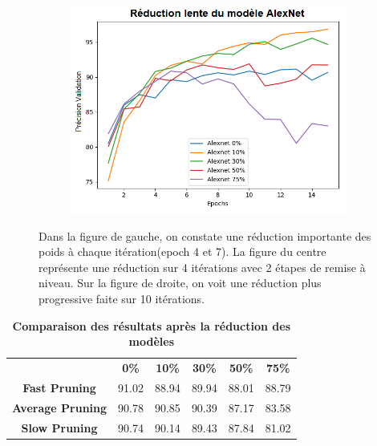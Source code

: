 \documentclass[12pt]{article}
\begin{document}
\begin{figure}[H]
\begin{subfigure}[b]{0.33\textwidth}
		\label{fig:pruneratioslow}
	\end{subfigure}
	\begin{subfigure}[b]{0.33\textwidth}
		\centering
		\includegraphics[width=\textwidth]{fig/prune_ratio_slow_fr}
		\label{fig:pruneratioslow}
	\end{subfigure}
	\caption{Dans la figure de gauche, on constate une réduction importante des poids à chaque itération(epoch 4 et 7). La figure du centre représente une réduction sur 4 itérations avec 2 étapes de remise à niveau. Sur la figure de droite, on voit une réduction plus progressive faite sur 10 itérations.}
\end{figure}

\begin{table}[H]
	\centering
	\caption {\textbf{Comparaison des résultats après la réduction des modèles}}
	\begin{tabular}{clllll}
		\textbf{}                & \multicolumn{1}{c}{\textbf{0\%}} & \multicolumn{1}{c}{\textbf{10\%}} & \multicolumn{1}{c}{\textbf{30\%}} & \multicolumn{1}{c}{\textbf{50\%}} & \multicolumn{1}{c}{\textbf{75\%}} \\
		\textbf{Fast Pruning}    & 91.02                            & 88.94                             & 89.94                             & 88.01                             & 88.79                             \\
		\textbf{Average Pruning} & 90.78                            & 90.85                             & 90.39                             & 87.17                             & 83.58                             \\
		\textbf{Slow Pruning}    & 90.74                            & 90.14                             & 89.43                             & 87.84                             & 81.02                            
	\end{tabular}
\end{table}
\end{document}
